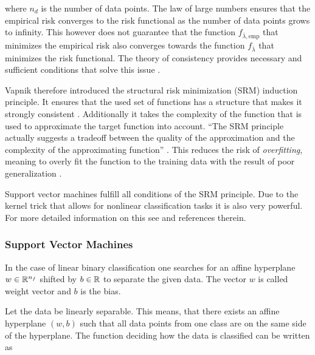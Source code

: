 where \(n_d\) is the number of data points.
The law of large numbers ensures that the empirical risk converges to the risk functional as the number of data points grows to infinity. This however does not guarantee that the function \(f_{\bar{\lambda},\text{emp}}\) that minimizes the empirical risk also converges towards the function \(f_{\bar{\lambda}}\) that minimizes the risk functional.
The theory of consistency provides necessary and sufficient conditions that solve this issue  \cite[p. 989]{Vapnik1999}.

Vapnik therefore introduced the structural risk minimization (SRM) induction principle. It ensures that the used set of functions has a structure that makes it strongly consistent \cite{Vapnik1999}. Additionally it takes the complexity of the function that is used to approximate the target function into account. ``The SRM principle actually suggests a tradeoff between the quality of the approximation and the complexity of the approximating function'' \cite[p. 994]{Vapnik1999}.
This reduces the risk of \emph{overfitting}, meaning to overly fit the function to the training data with the result of poor generalization \cite[chapter 1.3]{Cristianini2000}.


Support vector machines fulfill all conditions of the SRM principle. Due to the kernel trick that allows for nonlinear classification tasks it is also very powerful. For more detailed information on this see \cite{Kunapuli2008} and references therein.

\subsubsection{Support Vector Machines}
\label{sec_SVMs}

In the case of linear binary classification one searches for an affine hyperplane \(w \in \mathbb{R}^{n_f}\) shifted by \(b \in \mathbb{R}\) to separate the given data. The vector \(w\) is called weight vector and \(b\) is the bias.

Let the data be linearly separable. This means, that there exists an affine hyperplane \((w,b)\) such that all data points from one class are on the same side of the hyperplane. The function deciding how the data is classified can be written as

